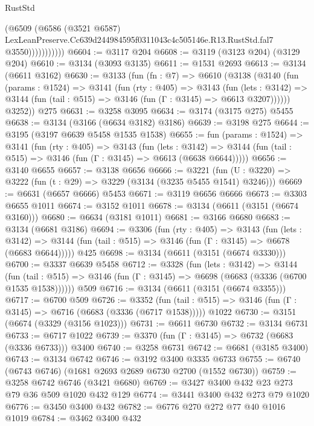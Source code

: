\begin{lexlean}{RustStd}
\begin{coremodule}
                      (@6509
                        (@6586
                          (@3521 @6587)
                          LexLeanPreserve.Cc639d244984595f0311043c4c505146e.R13.RustStd.fal7
                          @3550)))))))))))
@6604 := @3117 @204
@6608 := @3119 (@3123 @204) (@3129 @204)
@6610 := @3134 (@3093 @3135)
@6611 := @1531 @2693
@6613 := @3134 (@6611 @3162)
@6630 := @3133
    (fun (fn : @7) =>
    @6610
      (@3138
        (@3140
          (fun (params : @1524) =>
          @3141
            (fun (rty : @405) =>
            @3143
              (fun (lets : @3142) =>
              @3144 (fun (tail : @515) => @3146 (fun (Γ : @3145) => @6613 @3207))))))
        @3252))
    @275
@6631 := @3258 @3095
@6634 := @3174 (@3175 @275) @5455
@6638 := @3134 (@3166 (@6634 @3182) @3186)
@6639 := @3198 @275
@6644 := @3195 (@3197 @6639 @5458 @1535 @1538)
@6655 := fun (params : @1524) =>
  @3141
    (fun (rty : @405) =>
    @3143
      (fun (lets : @3142) =>
      @3144 (fun (tail : @515) => @3146 (fun (Γ : @3145) => @6613 (@6638 @6644)))))
@6656 := @3140 @6655
@6657 := @3138 @6656
@6666 := @3221 (fun (U : @3220) => @3222 (fun (t : @29) => @3229 (@3134 (@3235 @5455 @1541) @3246)))
@6669 := @6631 (@6657 @6666) @5453
@6671 := @3119 @6656 @6666
@6673 := @3303 @6655 @1011
@6674 := @3152 @1011
@6678 := @3134 (@6611 (@3151 (@6674 @3160)))
@6680 := @6634 (@3181 @1011)
@6681 := @3166 @6680
@6683 := @3134 (@6681 @3186)
@6694 := @3306
    (fun (rty : @405) =>
    @3143
      (fun (lets : @3142) =>
      @3144 (fun (tail : @515) => @3146 (fun (Γ : @3145) => @6678 (@6683 @6644)))))
    @425
@6698 := @3134 (@6611 (@3151 (@6674 @3330)))
@6700 := @3337 @6639 @5458
@6712 := @3328
    (fun (lets : @3142) =>
    @3144
      (fun (tail : @515) => @3146 (fun (Γ : @3145) => @6698 (@6683 (@3336 (@6700 @1535 @1538))))))
    @509
@6716 := @3134 (@6611 (@3151 (@6674 @3355)))
@6717 := @6700 @509
@6726 := @3352
    (fun (tail : @515) => @3146 (fun (Γ : @3145) => @6716 (@6683 (@3336 (@6717 @1538)))))
    @1022
@6730 := @3151 (@6674 (@3329 (@3156 @1023)))
@6731 := @6611 @6730
@6732 := @3134 @6731
@6733 := @6717 @1022
@6739 := @3370 (fun (Γ : @3145) => @6732 (@6683 (@3336 @6733))) @3400
@6740 := @3258 @6731
@6742 := @6681 (@3185 @3400)
@6743 := @3134 @6742
@6746 := @3192 @3400 @3335 @6733
@6755 := @6740 (@6743 @6746) (@1681 @2693 @2689 @6730 @2700 (@1552 @6730))
@6759 := @3258 @6742 @6746 (@3421 @6680)
@6769 := @3427 @3400 @432 @23 @273 @79 @36 @509 @1020 @432 @129
@6774 := @3441 @3400 @432 @273 @79 @1020
@6776 := @3450 @3400 @432
@6782 := @6776 @270 @272 @77 @40 @1016 @1019
@6784 := @3462 @3400 @432

\end{coremodule}
\end{lexlean}
